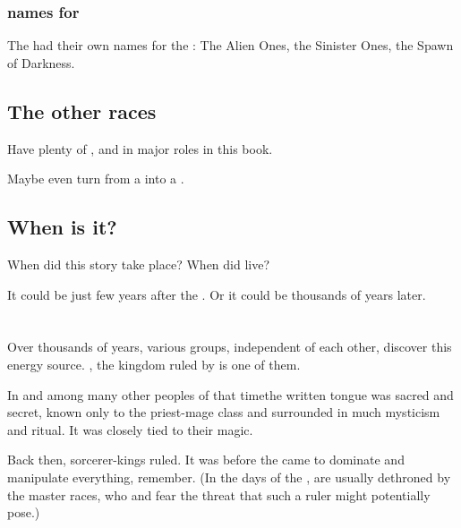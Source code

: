 \subsubsection{\Draconic names for \banes}
The \dragons{} had their own names for the \banes: 
The Alien Ones, the Sinister Ones, the Spawn of Darkness. 









\subsection{The other races}
Have plenty of \aryothim, \vorcanths{} and \quiljaaran{} in major roles in this book. 

Maybe even turn \Vexstrasshin{} from a \dragon{} into a \quiljaar. 









\subsection{When is it?}
When did this story take place? 
When did \Thanatzil{} live? 

It could be just few years after the .
Or it could be thousands of years later. 















\section{\Numah}
\index{\Numah}
Over thousands of years, various groups, independent of each other, discover this energy source. \Numah, the \nephilic{} kingdom ruled by  is one of them. 

In \Numah\dash and among many other \nephilic{} peoples of that time\dash the written tongue was sacred and secret, known only to the priest-mage class and surrounded in much mysticism and ritual. It was closely tied to their magic. 

Back then, sorcerer-kings ruled. 
It was before the \feud{} came to dominate and manipulate everything, remember. 
(In the days of the \charade,  are usually dethroned by the master races, who  and fear the threat that such a ruler might potentially pose.)

